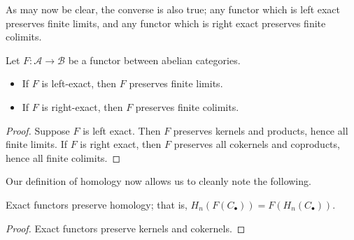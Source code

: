 \documentclass[main.tex]{subfiles}
\begin{document}
As may now be clear, the converse is also true; any functor which is left exact preserves finite limits, and any functor which is right exact preserves finite colimits.

\begin{proposition}
  Let $F\colon \mathcal{A} \to \mathcal{B}$ be a functor between abelian categories.
  \begin{itemize}
    \item If $F$ is left-exact, then $F$ preserves finite limits.

    \item If $F$ is right-exact, then $F$ preserves finite colimits.
  \end{itemize}
\end{proposition}
\begin{proof}
  Suppose $F$ is left exact. Then $F$ preserves kernels and products, hence all finite limits. If $F$ is right exact, then $F$ preserves all cokernels and coproducts, hence all finite colimits.
\end{proof}

Our definition of homology now allows us to cleanly note the following.
\begin{proposition}
  Exact functors preserve homology; that is, $H_{n}(F(C_{\bullet})) = F(H_{n}(C_{\bullet}))$.
\end{proposition}
\begin{proof}
  Exact functors preserve kernels and cokernels.
\end{proof}
\end{document}
